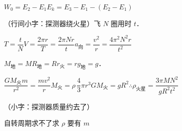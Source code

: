 $W_0=E_2-E_1$\quad\quad $E_k=E_3-E_1-(E_2-E_1)$
\begin{problem}[9]
（行间小字：探测器绕火星）飞 $N$ 圈用时 $t$．
\begin{solution}
$T=\dfrac tN$\quad $V=\dfrac{2\pi r}{T}=\dfrac{2\pi Nr}{t}$\quad $a_{\text{向}}=\dfrac{v^2}{r}=\dfrac{4\pi^2N^2r}{t^2}$%

$M_{\text{地}}=M$\quad $R_{\text{地}}=R$\quad $r_{\text{火}}=r$\quad $g_{\text{地}}=g$．

$\dfrac{GM_{\text{火}}m}{r^2}=\dfrac{mv^2}{r}$\quad $M_{\text{火}}=\rho\,\dfrac43\pi r^3$\quad $GM_{\text{火}}=gR^2$\quad $\therefore\rho_{\text{火星}}=\dfrac{3\pi MN^2}{gR^2t^2}$%

（小字：探测器质量约去了）

自转周期求不了\quad 求 $\rho$ 要有 $m$%
\end{solution}
\end{problem}
